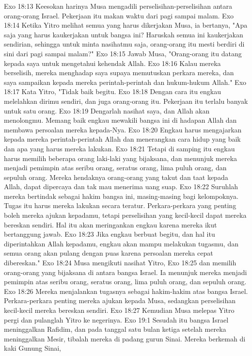 Exo 18:13  Keesokan harinya Musa mengadili perselisihan-perselisihan antara orang-orang Israel. Pekerjaan itu makan waktu dari pagi sampai malam.
Exo 18:14  Ketika Yitro melihat semua yang harus dikerjakan Musa, ia bertanya, "Apa saja yang harus kaukerjakan untuk bangsa ini? Haruskah semua ini kaukerjakan sendirian, sehingga untuk minta nasihatmu saja, orang-orang itu mesti berdiri di sini dari pagi sampai malam?"
Exo 18:15  Jawab Musa, "Orang-orang itu datang kepada saya untuk mengetahui kehendak Allah.
Exo 18:16  Kalau mereka berselisih, mereka menghadap saya supaya memutuskan perkara mereka, dan saya sampaikan kepada mereka perintah-perintah dan hukum-hukum Allah."
Exo 18:17  Kata Yitro, "Tidak baik begitu.
Exo 18:18  Dengan cara itu engkau melelahkan dirimu sendiri, dan juga orang-orang itu. Pekerjaan itu terlalu banyak untuk satu orang.
Exo 18:19  Dengarlah nasihat saya, dan Allah akan menolongmu. Memang baik engkau mewakili bangsa ini di hadapan Allah dan membawa persoalan mereka kepada-Nya.
Exo 18:20  Engkau harus mengajarkan kepada mereka perintah-perintah Allah dan menerangkan cara hidup yang baik dan apa yang harus mereka lakukan.
Exo 18:21  Tetapi di samping itu engkau harus memilih beberapa orang laki-laki yang bijaksana, dan menunjuk mereka menjadi pemimpin atas seribu orang, seratus orang, lima puluh orang, dan sepuluh orang. Mereka hendaknya orang-orang yang takut dan taat kepada Allah, dapat dipercaya dan tak mau menerima uang suap.
Exo 18:22  Suruhlah mereka bertindak sebagai hakim bangsa ini, masing-masing bagi kelompoknya. Tugas itu harus mereka lakukan secara teratur. Perkara-perkara yang penting boleh mereka ajukan kepadamu, tetapi perselisihan yang kecil-kecil dapat mereka bereskan sendiri. Hal itu akan meringankan engkau karena mereka ikut bertanggung jawab.
Exo 18:23  Jika engkau berbuat begitu, dan hal itu diperintahkan Allah kepadamu, engkau akan mampu melakukan tugasmu, dan semua orang akan pulang dengan puas karena persoalan mereka cepat dibereskan."
Exo 18:24  Musa mengikuti nasihat Yitro,
Exo 18:25  dan memilih orang-orang yang bijaksana di antara bangsa Israel. Ia menunjuk mereka menjadi pemimpin atas seribu orang, seratus orang, lima puluh orang, dan sepuluh orang.
Exo 18:26  Mereka menjalankan tugasnya sebagai hakim-hakim atas bangsa Israel. Perkara-perkara penting mereka ajukan kepada Musa, sedangkan perselisihan kecil-kecil mereka bereskan sendiri.
Exo 18:27  Kemudian Musa melepas Yitro pergi dan pulanglah Yitro ke negerinya.
Exo 19:1  Sesudah itu bangsa Israel meninggalkan Rafidim, dan pada tanggal satu bulan ketiga setelah mereka meninggalkan Mesir, tibalah mereka di padang gurun Sinai. Mereka berkemah di kaki Gunung Sinai,
